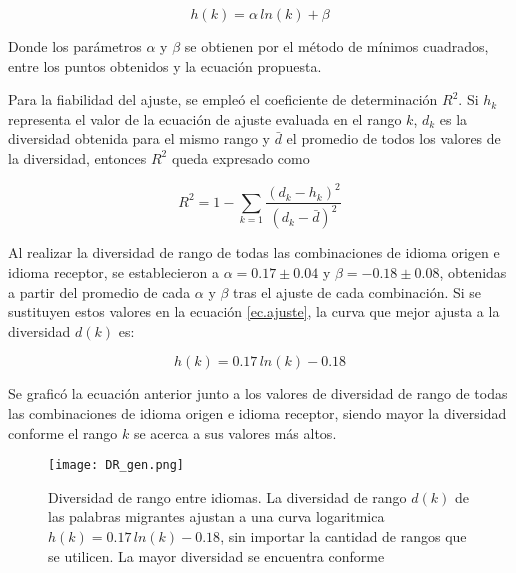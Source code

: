 \begin{equation}
\label{ec.ajuste}
h(k) =  \alpha \, ln(k) + \beta
\end{equation}

Donde los parámetros $\alpha$ y $\beta$  se  obtienen por el método de mínimos cuadrados, entre los puntos obtenidos y la ecuación propuesta.  



Para la fiabilidad del ajuste, se empleó el coeficiente de determinación $R^{2}$. Si $h_{k}$  representa el  valor de la ecuación de ajuste evaluada en el rango $k$,  $d_{k}$ es la diversidad obtenida para el mismo rango y $\bar{d}$ el promedio de todos los valores de la diversidad, entonces $R^{2}$ queda expresado como

\begin{equation}
\label{ec.r2_diversidad}
R^{2} = 1 - \sum_{k = 1} \frac{ \left( d_{k} - h_{k} \right)^{2}  }{ \left( d_{k} - \bar{d} \right)^{2} }	
\end{equation}

Al realizar la diversidad de rango de todas las combinaciones de idioma origen e idioma receptor,  se establecieron a $\alpha = 0.17\pm 0.04$ y $\beta = -0.18 \pm 0.08$, obtenidas a partir del promedio de cada $\alpha$ y $\beta$ tras el ajuste de cada combinación.  Si se sustituyen estos valores en la ecuación \ref{ec.ajuste}, la curva que mejor ajusta a la diversidad $d(k)$ es:


\begin{equation}
\label{ec.gen_ajs}
h(k) = 0.17\,ln(k) - 0.18
\end{equation} 

Se graficó la ecuación anterior junto a los valores de diversidad de rango de todas las combinaciones de idioma origen e idioma receptor, siendo mayor la diversidad conforme el rango $k$ se acerca a sus valores más altos.



\begin{figure}[h!]
	\centering
	\texttt{[image: DR\_gen.png]}
	\label{fig.DR_gen}
	\caption{Diversidad de rango entre idiomas. La diversidad de rango $d(k)$ de las palabras migrantes ajustan a una curva logaritmica $h(k) = 0.17\,ln(k) - 0.18$, sin importar la cantidad de rangos que se utilicen. La mayor diversidad se encuentra conforme }
\end{figure}


